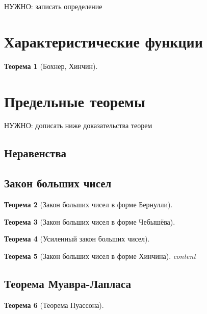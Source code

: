 \documentclass[12pt]{article}
\newtheorem{theorem}{Теорема}
\numberwithin{theorem}{section}
\theoremstyle{definition}
\newcommand{\TODO}[1]{\textcolor{todocolor}{НУЖНО: #1}}
\begin{document}
	\TODO{записать определение}
	
	\section{Характеристические функции}
	
	\begin{theorem}[Бохнер, Хинчин]
		
	\end{theorem}
	
	\section{Предельные теоремы}
	
	\TODO{дописать ниже доказательства теорем}
	
	\subsection{Неравенства}
	
	\subsection{Закон больших чисел}
	
	\begin{theorem}[Закон больших чисел в форме Бернулли]
		
	\end{theorem}
	
	\begin{theorem}[Закон больших чисел в форме Чебышёва]
		
	\end{theorem}
	
	\begin{theorem}[Усиленный закон больших чисел]
		
	\end{theorem}
	
	\begin{theorem}[Закон больших чисел в форме Хинчина]
		content
	\end{theorem}
	
	\subsection{Теорема Муавра-Лапласа}
	
	\begin{theorem}[Теорема Пуассона]
		
	\end{theorem}
	
\end{document}
